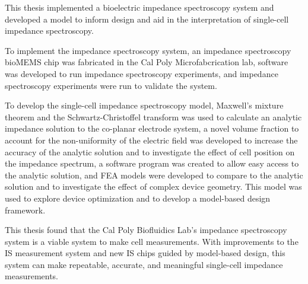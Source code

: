 
\par This thesis implemented a bioelectric impedance spectroscopy system and developed a model to inform design and aid in the interpretation of single-cell impedance spectroscopy.
\par To implement the impedance spectroscopy system, an impedance spectroscopy bioMEMS chip was fabricated in the Cal Poly Microfabcrication lab, software was developed to run impedance spectroscopy experiments, and impedance spectroscopy experiments were run to validate the system. 
\par To develop the single-cell impedance spectroscopy model, Maxwell's mixture theorem and the Schwartz-Christoffel transform was used to calculate an analytic impedance solution to the co-planar electrode system, a novel volume fraction to account for the non-uniformity of the electric field was developed to increase the accuracy of the analytic solution and to investigate the effect of cell position on the impedance spectrum, a software program was created to allow easy access to the analytic solution, and FEA models were developed to compare to the analytic solution and to investigate the effect of complex device geometry. This model was used to explore device optimization and to develop a model-based design framework.

\par This thesis found that the Cal Poly Biofluidics Lab's impedance spectroscopy system is a viable system to make cell measurements. With improvements to the IS measurement system and new IS chips guided by model-based design, this system can make repeatable, accurate, and meaningful single-cell impedance measurements.

